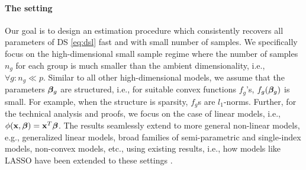 \paragraph{The setting} Our goal is to design an estimation procedure which consistently recovers all parameters of DS \cref{eq:dsl} fast and with small number of samples.
We specifically focus on the high-dimensional small sample regime where the number of samples $n_g$ for each group is much smaller than the ambient 
dimensionality, i.e., $\forall g: n_g \ll p$. Similar to all other high-dimensional models, we assume that the parameters $\boldsymbol{\beta}_g$ are structured, i.e., for suitable convex functions $f_g$'s, $f_g(\boldsymbol{\beta}_g)$ is small.
For example, when the structure is sparsity, $f_g$s are $l_1$-norms. Further, for the technical analysis and proofs,
we focus on the case of linear models, i.e., $\phi(\mathbf{x},\boldsymbol{\beta}) = \mathbf{x}^T \boldsymbol{\beta}$. The results
seamlessly extend to more general non-linear models, e.g., generalized linear models, broad families of semi-parametric and single-index models, non-convex models, etc., using
existing results, i.e., how models like LASSO have been extended to these settings \cite{Kakade2010-st, negahban2012restricted, Plan2013-nx, Plan2016-de, Yang2016-zd}. %


